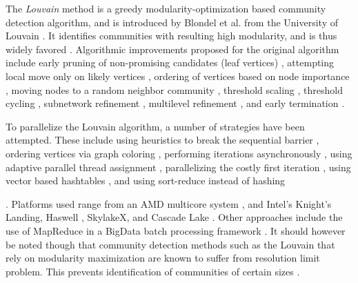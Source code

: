 The \textit{Louvain} method is a greedy modularity-optimization based community detection algorithm, and is introduced by Blondel et al. from the University of Louvain \cite{com-blondel08}. It identifies communities with resulting high modularity, and is thus widely favored \cite{com-lancichinetti09}. Algorithmic improvements proposed for the original algorithm include early pruning of non-promising candidates (leaf vertices) \cite{com-ryu16, com-halappanavar17, com-zhang21, com-you22}, attempting local move only on likely vertices \cite{com-ryu16, com-ozaki16, com-zhang21, com-shi21}, ordering of vertices based on node importance \cite{com-aldabobi22}, moving nodes to a random neighbor community \cite{com-traag15}, threshold scaling \cite{com-lu15, com-naim17, com-halappanavar17}, threshold cycling \cite{com-ghosh18}, subnetwork refinement \cite{com-waltman13, com-traag19}, multilevel refinement \cite{com-rotta11, com-gach14, com-shi21}, and early termination \cite{com-ghosh18}.

To parallelize the Louvain algorithm, a number of strategies have been attempted. These include using heuristics to break the sequential barrier \cite{com-lu15}, ordering vertices via graph coloring \cite{com-halappanavar17}, performing iterations asynchronously \cite{com-que15, com-shi21}, using adaptive parallel thread assignment \cite{com-fazlali17, com-naim17, com-sattar19, com-mohammadi20}, parallelizing the costly first iteration \cite{com-wickramaarachchi14}, using vector based hashtables \cite{com-halappanavar17}, and using sort-reduce instead of hashing \cite{com-cheong13}. Platforms used range from an AMD multicore system \cite{com-fazlali17}, and Intel’s Knight's Landing, Haswell \cite{com-gheibi20}, SkylakeX, and Cascade Lake \cite{part-hossain21}. Other approaches include the use of MapReduce in a BigData batch processing framework \cite{com-zeitz17}. It should however be noted though that community detection methods such as the Louvain that rely on modularity maximization are known to suffer from resolution limit problem. This prevents identification of communities of certain sizes \cite{com-ghosh19}.

